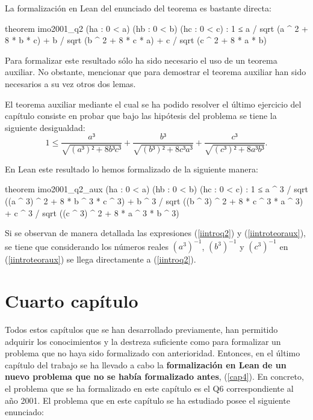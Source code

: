 La formalización en Lean del enunciado del teorema es bastante directa:

\begin{leancode}
theorem imo2001_q2
  (ha : 0 < a)
  (hb : 0 < b)
  (hc : 0 < c)
  : 1 ≤ a / sqrt (a ^ 2 + 8 * b * c) +
        b / sqrt (b ^ 2 + 8 * c * a) +
        c / sqrt (c ^ 2 + 8 * a * b)
\end{leancode}

Para formalizar este resultado sólo ha sido necesario el uso de un
teorema auxiliar. No obstante, mencionar que para demostrar el teorema
auxiliar han sido necesarios a su vez otros dos lemas.

El teorema auxiliar mediante el cual se ha podido resolver el último
ejercicio del capítulo consiste en probar que bajo las hipótesis del
problema se tiene la siguiente desigualdad:
\begin{equation}\label{iintroteoraux}
   1 ≤ \frac{a³}{\sqrt{(a³)²+8b³c³}}+\frac{b³}{\sqrt{(b³)²+8c³a³}}+
    \frac{c³}{\sqrt{(c³)²+8a³b³}}.
\end{equation}

En Lean este resultado lo hemos formalizado de la siguiente manera:
\begin{leancode}
theorem imo2001_q2_aux
  (ha : 0 < a)
  (hb : 0 < b)
  (hc : 0 < c)
  : 1 ≤ a ^ 3 / sqrt ((a ^ 3) ^ 2 + 8 * b ^ 3 * c ^ 3) +
        b ^ 3 / sqrt ((b ^ 3) ^ 2 + 8 * c ^ 3 * a ^ 3) +
        c ^ 3 / sqrt ((c ^ 3) ^ 2 + 8 * a ^ 3 * b ^ 3)
\end{leancode}

Si se observan de manera detallada las expresiones (\ref{iintroq2}) y
(\ref{iintroteoraux}), se tiene que considerando los números reales
\((a^{3})^{-1}\), \((b^{3})^{-1}\) y \((c^{3})^{-1}\) en
(\ref{iintroteoraux}) se llega directamente a (\ref{iintroq2}).

\section*{Cuarto capítulo}

Todos estos capítulos que se han desarrollado previamente, han permitido
adquirir los conocimientos y la destreza suficiente como para formalizar
un problema que no haya sido formalizado con anterioridad. Entonces, en
el último capítulo del trabajo se ha llevado a cabo la
\textbf{formalización en Lean de un nuevo problema que no se había
formalizado antes}, (\ref{cap4}). En concreto, el problema que se ha
formalizado en este capítulo es el Q6 correspondiente al año 2001. El
problema que en este capítulo se ha estudiado posee el siguiente
enunciado:

